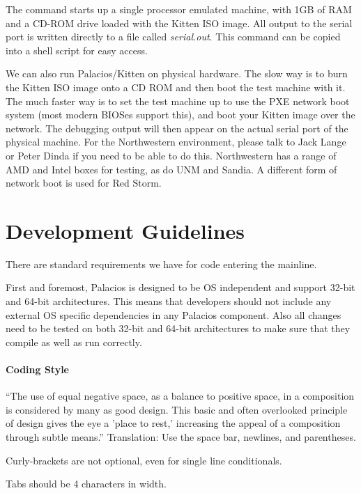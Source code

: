 \documentclass[11pt]{article}
\begin{document}
The command starts up a single processor emulated machine, with 1GB of
RAM and a CD-ROM drive loaded with the Kitten ISO image.  All output
to the serial port is written directly to a file called {\em
  serial.out}. This command can be copied into a shell script for easy
access.

We can also run Palacios/Kitten on physical hardware.  The slow way is
to burn the Kitten ISO image onto a CD ROM and then boot the test
machine with it.  The much faster way is to set the test machine up to
use the PXE network boot system (most modern BIOSes support this), and
boot your Kitten image over the network.  The debugging output will
then appear on the actual serial port of the physical machine.  For
the Northwestern environment, please talk to Jack Lange or Peter Dinda
if you need to be able to do this.  Northwestern has a range of AMD
and Intel boxes for testing, as do UNM and Sandia.    A different form
of network boot is used for Red Storm. 


\section{Development Guidelines}

There are standard requirements we have for code entering the mainline. 

First and foremost, Palacios is designed to be OS independent and
support 32-bit and 64-bit architectures. This means that developers should
not include any external OS specific dependencies in any Palacios
component. Also all changes need to be tested on both 32-bit and 64-bit
architectures to make sure that they compile as well as run correctly.

\paragraph*{Coding Style}

``The use of equal negative space, as a balance to positive space, in a
composition is considered by many as good design. This basic and often
overlooked principle of design gives the eye a 'place to rest,'
increasing the appeal of a composition through subtle means.''
\newline\newline
Translation: Use the space bar, newlines, and parentheses. 

Curly-brackets are not optional, even for single line conditionals. 

Tabs should be 4 characters in width.
\end{document}
